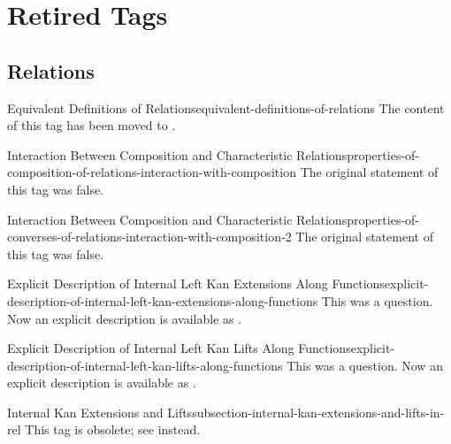 \section{Retired Tags}\label{section-retired-tags}
\subsection{Relations}\label{subsection-retired-tags-relations}
\begin{oldtag}{Equivalent Definitions of Relations}{equivalent-definitions-of-relations}%
    The content of this tag has been moved to .
\end{oldtag}
\begin{oldtag}{Interaction Between Composition and Characteristic Relations}{properties-of-composition-of-relations-interaction-with-composition}%
    The original statement of this tag was false.
\end{oldtag}
\begin{oldtag}{Interaction Between Composition and Characteristic Relations}{properties-of-converses-of-relations-interaction-with-composition-2}%
    The original statement of this tag was false.
\end{oldtag}
\begin{oldtag}{Explicit Description of Internal Left Kan Extensions Along Functions}{explicit-description-of-internal-left-kan-extensions-along-functions}%
    This was a question. Now an explicit description is available as . 
\end{oldtag}
\begin{oldtag}{Explicit Description of Internal Left Kan Lifts Along Functions}{explicit-description-of-internal-left-kan-lifts-along-functions}%
    This was a question. Now an explicit description is available as . 
\end{oldtag}
\begin{oldtag}{Internal Kan Extensions and Lifts}{subsection-internal-kan-extensions-and-lifts-in-rel}%
    This tag is obsolete; see  instead.
\end{oldtag}
